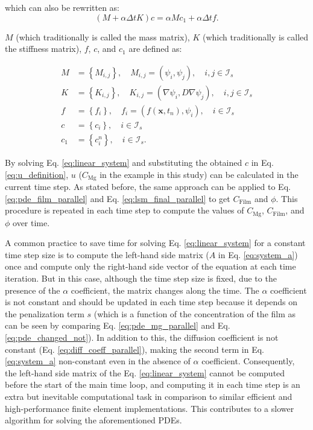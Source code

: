 \noindent which can also be rewritten as:
\begin{equation} \label{eq:linear_eq_simple}
(M+\alpha \Delta t K) c=\alpha M c_{1}+\alpha \Delta t f.
\end{equation}

$M$ (which traditionally is called the mass matrix), $K$ (which traditionally is called the stiffness matrix), $f$, $c$, and $c_1$ are defined as:

\begin{equation} \label{eq:matrices_defintion}
\begin{aligned} M &=\left\{M_{i, j}\right\}, \quad M_{i, j}=\left(\psi_{i}, \psi_{j}\right), \quad i, j \in \mathcal{I}_{s} \\ K &=\left\{K_{i, j}\right\}, \quad K_{i, j}=\left(\nabla \psi_{i}, D \nabla \psi_{j}\right), \quad i, j \in \mathcal{I}_{s} \\ f &=\left\{f_{i}\right\}, \quad f_{i}=\left(f\left(\boldsymbol{x}, t_{n}\right), \psi_{i}\right), \quad i \in \mathcal{I}_{s} \\ c &=\left\{c_{i}\right\}, \quad i \in \mathcal{I}_{s} \\ c_{1} &=\left\{c_{i}^{n}\right\}, \quad i \in \mathcal{I}_{s}. \end{aligned}
\end{equation}

By solving Eq. \ref{eq:linear_system} and substituting the obtained $c$ in Eq. \ref{eq:u_definition}, $u$ ($C_{\mathrm{Mg}}$ in the example in this study) can be calculated in the current time step. As stated before, the same approach can be applied to Eq. \ref{eq:pde_film_parallel} and Eq. \ref{eq:lsm_final_parallel} to get $C_{\mathrm{Film}}$ and $\phi$. This procedure is repeated in each time step to compute the values of $C_{\mathrm{Mg}}$, $C_{\mathrm{Film}}$, and $\phi$ over time.

A common practice to save time for solving Eq. \ref{eq:linear_system}  for a constant time step size is to compute the left-hand side matrix ($A$ in Eq. \ref{eq:system_a}) once and compute only the right-hand side vector of the equation at each time iteration. But in this case, although the time step size is fixed, due to the presence of the $\alpha$ coefficient, the matrix changes along the time. The $\alpha$ coefficient is not constant and should be updated in each time step because it depends on the penalization term $s$ (which is a function of the concentration of the film as can be seen by comparing Eq. \ref{eq:pde_mg_parallel} and Eq. \ref{eq:pde_changed_not}). In addition to this, the diffusion coefficient is not constant (Eq. \ref{eq:diff_coeff_parallel}), making the second term in Eq. \ref{eq:system_a} non-constant even in the absence of $\alpha$ coefficient. Consequently, the left-hand side matrix of the Eq. \ref{eq:linear_system} cannot be computed before the start of the main time loop, and computing it in each time step is an extra but inevitable computational task in comparison to similar efficient and high-performance finite element implementations. This contributes to a slower algorithm for solving the aforementioned \gls{PDE}s.



